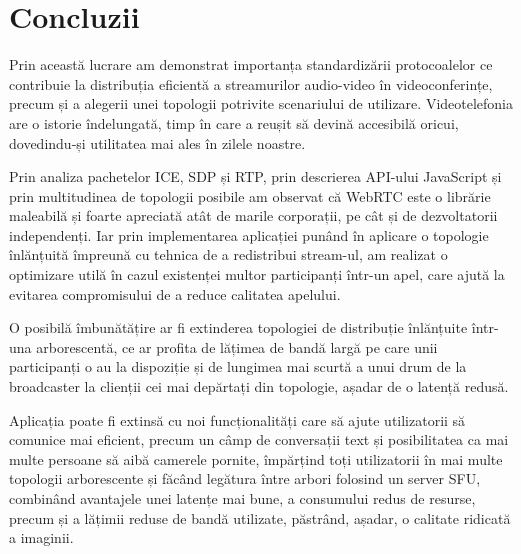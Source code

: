 \chapter{Concluzii}
\label{sec:ch7}

\indent \par Prin această lucrare am demonstrat importanța standardizării protocoalelor ce contribuie la distribuția eficientă a streamurilor audio-video în videoconferințe, precum și a alegerii unei topologii potrivite scenariului de utilizare. Videotelefonia are o istorie îndelungată, timp în care a reușit să devină accesibilă oricui, dovedindu-și utilitatea mai ales în zilele noastre.
\indent \par Prin analiza pachetelor ICE, SDP și RTP, prin descrierea API-ului JavaScript și prin multitudinea de topologii posibile am observat că WebRTC este o librărie maleabilă și foarte apreciată atât de marile corporații, pe cât și de dezvoltatorii independenți. Iar prin implementarea aplicației punând în aplicare o topologie înlănțuită împreună cu tehnica de a redistribui stream-ul, am realizat o optimizare utilă în cazul existenței multor participanți într-un apel, care ajută la evitarea compromisului de a reduce calitatea apelului.
\indent \par O posibilă îmbunătățire ar fi extinderea topologiei de distribuție înlănțuite într-una arborescentă, ce ar profita de lățimea de bandă largă pe care unii participanți o au la dispoziție și de lungimea mai scurtă a unui drum de la broadcaster la clienții cei mai depărtați din topologie, așadar de o latență redusă.
\indent \par Aplicația poate fi extinsă cu noi funcționalități care să ajute utilizatorii să comunice mai eficient, precum un câmp de conversații text și posibilitatea ca mai multe persoane să aibă camerele pornite, împărțind toți utilizatorii în mai multe topologii arborescente și făcând legătura între arbori folosind un server SFU, combinând avantajele unei latențe mai bune, a consumului redus de resurse, precum și a lățimii reduse de bandă utilizate, păstrând, așadar, o calitate ridicată a imaginii.